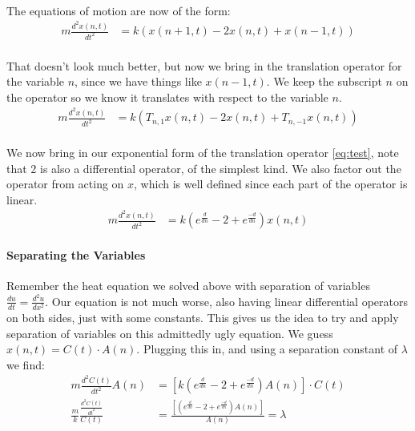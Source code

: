 \documentclass{article}
\begin{document}
	\paragraph{}
		The equations of motion are now of the form:
	\begin{align}
		m\frac{d^{2}x(n,t)}{dt^{2}} &= k(x(n + 1,t)- 2x(n,t) + x(n - 1,t))
	\end{align}
	\paragraph{}
	That doesn't look much better, but now we bring in the translation operator for the variable $n$, since we have things like $x(n - 1, t)$. We keep the subscript $n$ on the operator so we know it translates with respect to the variable $n$.
	\begin{align}
		m\frac{d^{2}x(n,t)}{dt^{2}} &= k(T_{n,1}x(n,t)- 2x(n,t) + T_{n,-1}x(n,t))
	\end{align}
	\paragraph{}
	We now bring in our exponential form of the translation operator \eqref{eq:test}, note that 2 is also a differential operator, of the simplest kind. We also factor out the operator from acting on $x$, which is well defined since each part of the operator is linear.
	\begin{align}
		m\frac{d^{2}x(n,t)}{dt^{2}} &= k(e^{\frac{d}{dn}} - 2 + e^{\frac{-d}{dn}})x(n,t)
	\end{align}
	\paragraph{Separating the Variables}
	Remember the heat equation we solved above with separation of variables $\frac{du}{dt} = \frac{d^{2}u}{dx^{2}}$. Our equation is not much worse, also having linear differential operators on both sides, just with some constants. This gives us the idea to try and apply separation of variables on this admittedly ugly equation. We guess $x(n, t) = C(t)\cdot A(n)$. Plugging this in, and using a separation constant of $\lambda$ we find:
	\begin{align}
		m\frac{d^{2}C(t)}{dt^{2}} A(n) &=[ k(e^{\frac{d}{dn}} - 2 + e^{\frac{-d}{dn}})A(n) ]\cdot C(t)\\
		\frac{m}{k}\frac{\frac{d^{2}C(t)}{dt^{2}}}{C(t)} &= \frac{[ (e^{\frac{d}{dn}} - 2 + e^{\frac{-d}{dn}})A(n) ]}{A(n)} = \lambda
	\end{align}
\end{document}
